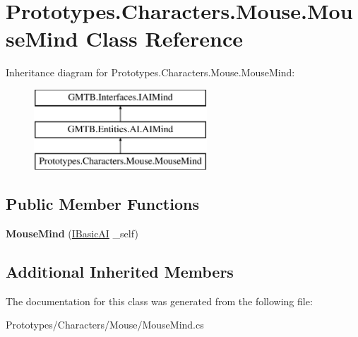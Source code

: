 \hypertarget{class_prototypes_1_1_characters_1_1_mouse_1_1_mouse_mind}{}\section{Prototypes.\+Characters.\+Mouse.\+Mouse\+Mind Class Reference}
\label{class_prototypes_1_1_characters_1_1_mouse_1_1_mouse_mind}
Inheritance diagram for Prototypes.\+Characters.\+Mouse.\+Mouse\+Mind\+:\begin{figure}[H]
\begin{center}
\leavevmode
\includegraphics[height=3.000000cm]{class_prototypes_1_1_characters_1_1_mouse_1_1_mouse_mind}
\end{center}
\end{figure}
\subsection*{Public Member Functions}
\begin{DoxyCompactItemize}
\item 
\mbox{\label{class_prototypes_1_1_characters_1_1_mouse_1_1_mouse_mind_a439bb79ad1ea6db778cd77555af84c81}} 
{\bfseries Mouse\+Mind} (\mbox{\hyperlink{interface_g_m_t_b_1_1_interfaces_1_1_i_basic_a_i}{I\+Basic\+AI}} \+\_\+self)
\end{DoxyCompactItemize}
\subsection*{Additional Inherited Members}


The documentation for this class was generated from the following file\+:\begin{DoxyCompactItemize}
\item 
Prototypes/\+Characters/\+Mouse/Mouse\+Mind.\+cs\end{DoxyCompactItemize}
